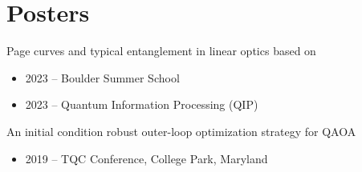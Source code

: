 \section{Posters}

\cventry
  {}
  {Page curves and typical entanglement in linear optics}
  {based on \cite{iosue2023page-curves-and}}
  {}
  {}
  {
    \begin{itemize}
        \item 2023 -- Boulder Summer School
        \item 2023 -- Quantum Information Processing (QIP)
    \end{itemize}
  }

\cventry
  {}
  {An initial condition robust outer-loop optimization strategy for QAOA}
  {}
  {}
  {}
  {
    \begin{itemize}
        \item 2019 -- TQC Conference, College Park, Maryland
    \end{itemize}
  }

